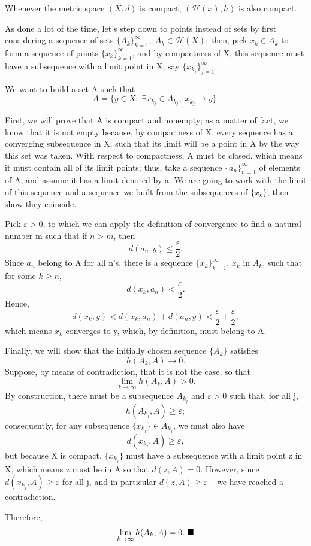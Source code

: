 \documentclass[../fractals_everywhere.tex]{subfiles}
\begin{document}
\begin{theorem*}
	Whenever the metric space \((X, d)\) is compact, \((\mathcal{H}(x), h)\) is also compact.
\end{theorem*}
\begin{proof*}
	As done a lot of the time, let's step down to points instead of sets by first considering a sequence of sets \(\{A_{k}\}_{k=1}^{\infty},\; A_{k}\in \mathcal{H}(X)\); then, pick \(x_{k}\in A_{k}\) to form a sequence of points \(\{x_{k}\}_{k=1}^{\infty}\), and by compactness of X, this sequence must have a subsequence with a limit point in X, say \(\{x_{k_{j}}\}_{j=1}^{\infty}\).

	We want to build a set A such that
	\[
		A = \{y\in X:\; \exists x_{k_{j}}\in A_{k_{j}},\; x_{k_{j}}\to y\}.
	\]

	First, we will prove that A is compact and nonempty; as a matter of fact, we know that it is not empty because, by compactness of X, every sequence has a converging subsequence in X, such that its limit will be a point in A by the way this set was taken.
	With respect to compactness, A must be closed, which means it must contain all of its limit points; thus, take a sequence \(\{a_{n}\}_{n=1}^{\infty}\) of elements of A, and assume it has a limit denoted by a.
	We are going to work with the limit of this sequence and a sequence we built from the subsequences of \(\{x_{k}\}\), then show they coincide.

	Pick \(\varepsilon  > 0 \), to which we can apply the definition of convergence to find a natural number m such that if \(n > m\), then
	\[
		d(a_{n}, y) \leq \frac{\varepsilon }{2}.
	\]
	Since \(a_{n}\) belong to A for all n's, there is a sequence \(\{x_{k}\}_{k=1}^{\infty}\), \(x_{k}\) in \(A_{k}\), such that for some \(k\geq n\),
	\[
		d(x_{k}, a_{n}) < \frac{\varepsilon }{2}.
	\]
	Hence,
	\[
		d(x_{k}, y) < d(x_{k}, a_{n}) + d(a_{n}, y) < \frac{\varepsilon }{2} + \frac{\varepsilon }{2},
	\]
	which means \(x_{k}\) converges to y, which, by definition, must belong to A.

	Finally, we will show that the initially chosen sequence \(\{A_{k}\}\) satisfies
	\[
		h(A_{k}, A) \to 0.
	\]
	Suppose, by means of contradiction, that it is not the case, so that
	\[
		\lim_{k\to \infty}h(A_{k}, A) > 0.
	\]
	By construction, there must be a subsequence \(A_{k_{j}}\) and \(\varepsilon  > 0\) such that, for all j,
	\[
		h(A_{k_{j}}, A)\geq \varepsilon;
	\]
	consequently, for any subsequence \(\{x_{k_{j}}\}\in A_{k_{j}}\), we must also have
	\[
		d(x_{k_{j}}, A)\geq \varepsilon,
	\]
	but because X is compact, \(\{x_{k_{j}}\}\) must have a subsequence with a limit point z in X, which means z must be in A so that \(d(z, A) = 0\). However, since \(d(x_{k_{j}}, A)\geq \varepsilon \) for all j, and in particular \(d(z, A)\geq \varepsilon \) -- we have reached a contradiction.

	Therefore,
	\[
		\lim_{k\to \infty}h(A_{k}, A) = 0. \text{ $\blacksquare$}
	\]
\end{proof*}
\end{document}
